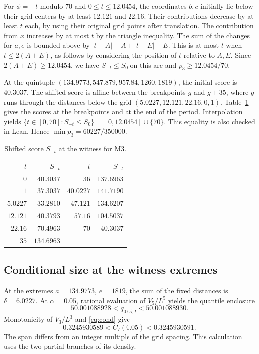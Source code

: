 \documentclass[11pt,a4paper]{article}
\begin{document}
For $\phi=-t$ modulo 70 and $0\leq t\leq12.0454$, the coordinates $b,c$ initially lie below their grid centers by at least $12.121$ and $22.16$. Their contributions decrease by at least $t$ each, by using their original grid points after translation. The contribution from $x$ increases by at most $t$ by the triangle inequality. The sum of the changes for $a,e$ is bounded above by $|t-A|-A+|t-E|-E$. This is at most $t$ when $t\leq2(A+E)$, as follows by considering the position of $t$ relative to $A,E$. Since $2(A+E)\geq12.0454$, we have $S_{-t}\leq S_0$ on this arc and $p_3\geq12.0454/70$.

At the quintuple $(134.9773,547.879,957.84,1260,1819)$, the initial score is $40.3037$. The shifted score is affine between the breakpoints $g$ and $g+35$, where $g$ runs through the distances below the grid $(5.0227,12.121,22.16,0,1)$. Table~\ref{tab:phase} gives the scores at the breakpoints and at the end of the period. Interpolation yields $\{t\in[0,70]:S_{-t}\leq S_0\}=[0,12.0454]\cup\{70\}$. This equality is also checked in Lean. Hence $\min p_3=60227/350000$.

\begin{table}[htbp]
\centering
\caption{Shifted score $S_{-t}$ at the witness for M3.}
\label{tab:phase}
\begin{tabular}{rr@{\qquad}rr}
\toprule
$t$ & $S_{-t}$ & $t$ & $S_{-t}$\\
\midrule
$0$      & $40.3037$ & $36$      & $137.6963$\\
$1$      & $37.3037$ & $40.0227$ & $141.7190$\\
$5.0227$ & $33.2810$ & $47.121$  & $134.6207$\\
$12.121$ & $40.3793$ & $57.16$   & $104.5037$\\
$22.16$  & $70.4963$ & $70$      & $40.3037$\\
$35$     & $134.6963$ &            &\\
\bottomrule
\end{tabular}
\end{table}

\subsection{Conditional size at the witness extremes}

At the extremes $a=134.9773$, $e=1819$, the sum of the fixed distances is $\delta=6.0227$. At $\alpha=0.05$, rational evaluation of $V_5/L^5$ yields the quantile enclosure
\[
50.001088928<q_{0.05,I}<50.001088930.
\]
Monotonicity of $V_3/L^3$ and \eqref{eq:cond} give
\[
0.3245930589<C_I(0.05)<0.3245930591.
\]
The span differs from an integer multiple of the grid spacing. This calculation uses the two partial branches of its density.
\end{document}
